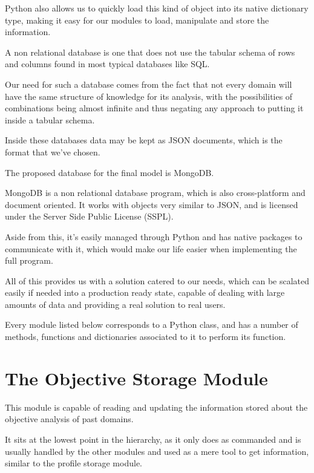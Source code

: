 Python also allows us to quickly load this kind of object into its native dictionary type, making it easy for our modules to load, manipulate and store the information.

A non relational database is one that does not use the tabular schema of rows and columns found in most typical databases like SQL.

Our need for such a database comes from the fact that not every domain will have the same structure of knowledge for its analysis, with the possibilities of combinations being almost infinite and thus negating any approach to putting it inside a tabular schema.

Inside these databases data may be kept as JSON documents, which is the format that we've chosen.

The proposed database for the final model is MongoDB. 

MongoDB is a non relational database program, which is also cross-platform and document oriented. It works with objects very similar to JSON, and is licensed under the Server Side Public License (SSPL). 

Aside from this, it's easily managed through Python and has native packages to communicate with it, which would make our life easier when implementing the full program.

All of this provides us with a solution catered to our needs, which can be scalated easily if needed into a production ready state, capable of dealing with large amounts of data and providing a real solution to real users.

Every module listed below corresponds to a Python class, and has a number of methods, functions and dictionaries associated to it to perform its function.

\section{The Objective Storage Module}
\label{cap2:sec:objjson}

This module is capable of reading and updating the information stored about the objective analysis of past domains.

It sits at the lowest point in the hierarchy, as it only does as commanded and is usually handled by the other modules and used as a mere tool to get information, similar to the profile storage module.

